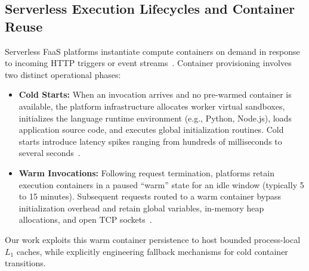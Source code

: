\documentclass[conference]{IEEEtran}
\begin{document}
\subsection{Serverless Execution Lifecycles and Container Reuse}
Serverless FaaS platforms instantiate compute containers on demand in response to incoming HTTP triggers or event streams~\cite{shahrad2020}. Container provisioning involves two distinct operational phases:
\begin{itemize}
    \item \textbf{Cold Starts:} When an invocation arrives and no pre-warmed container is available, the platform infrastructure allocates worker virtual sandboxes, initializes the language runtime environment (e.g., Python, Node.js), loads application source code, and executes global initialization routines. Cold starts introduce latency spikes ranging from hundreds of milliseconds to several seconds~\cite{silva2020}.
    \item \textbf{Warm Invocations:} Following request termination, platforms retain execution containers in a paused ``warm'' state for an idle window (typically 5 to 15 minutes). Subsequent requests routed to a warm container bypass initialization overhead and retain global variables, in-memory heap allocations, and open TCP sockets~\cite{wang2018peeking}.
\end{itemize}
Our work exploits this warm container persistence to host bounded process-local $L_1$ caches, while explicitly engineering fallback mechanisms for cold container transitions.
\end{document}
